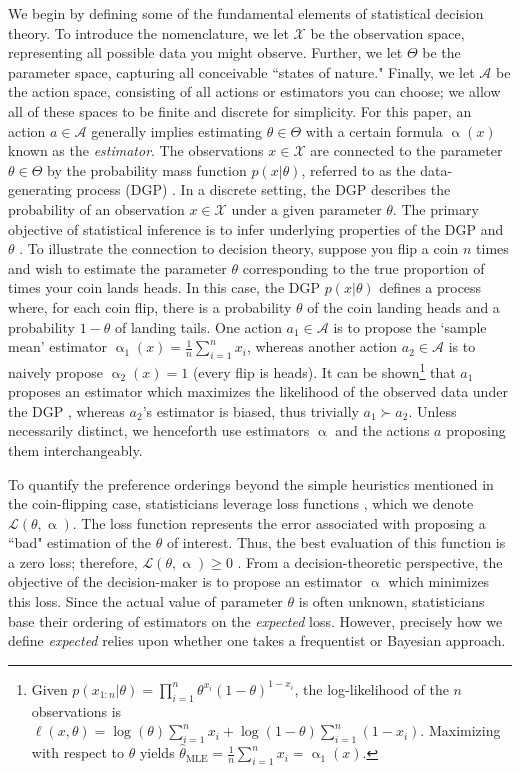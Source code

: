 \documentclass[letterpaper,12pt]{article}
\newcommand{\given}{|}
\begin{document}
We begin by defining some of the fundamental elements of statistical decision theory. To introduce the nomenclature, we let $\mathcal{X}$ be the observation space, representing all possible data you might observe. Further, we let ${\Theta}$ be the parameter space, capturing all conceivable ``states of nature." Finally, we let $\mathcal{A}$ be the action space, consisting of all actions or estimators you can choose; we allow all of these spaces to be finite and discrete for simplicity. For this paper, an action $a \in \mathcal{A}$ generally implies estimating $\theta \in \Theta$ with a certain formula $\upalpha(x)$ known as the \textit{estimator}. The observations $x \in \mathcal{X}$ are connected to the parameter $\theta \in \Theta$ by the probability mass function $p(x \given \theta)$, referred to as the data-generating process (DGP) \cite{tu2004data}. In a discrete setting, the DGP describes the probability of an observation $x \in \mathcal{X}$ under a given parameter $\theta$. The primary objective of statistical inference is to infer underlying properties of the DGP and $\theta$ \cite{upton2008oxford}. To illustrate the connection to decision theory\label{ex:1}, suppose you flip a coin $n$ times and wish to estimate the parameter $\theta$ corresponding to the true proportion of times your coin lands heads. In this case, the DGP $p(x \given \theta)$ defines a process where, for each coin flip, there is a probability $\theta$ of the coin landing heads and a probability $1- \theta$ of landing tails. One action $a_1 \in \mathcal{A}$ is to propose the `sample mean' estimator $\upalpha_1(x) = \frac{1}{n}\sum_{i = 1}^n x_i$, whereas another action $a_2 \in \mathcal{A}$ is to naively propose $\upalpha_2 (x) = 1$ (every flip is heads). It can be shown\footnote{ Given $p(x_{1:n}\given \theta) = \prod_{i = 1}^n\theta^{x_i}(1-\theta)^{1-x_i}$, the log-likelihood of the $n$ observations is $\ell(x, \theta) = \log(\theta) \sum_{i = 1}^n x_i + \log(1 - \theta) \sum_{i = 1}^n (1 - x_i)$. Maximizing with respect to $\theta$ yields $\hat{\theta}_{\text{MLE}} = \frac{1}{n}\sum_{i = 1}^n x_i = \upalpha_1(x)$.} that $a_1$ proposes an estimator which maximizes the likelihood of the observed data under the DGP \cite{rossi2018}, whereas $a_2$'s estimator is biased, thus trivially $a_1 \succ a_2$. Unless necessarily distinct, we henceforth use estimators $\upalpha$ and the actions $a$ proposing them interchangeably. 

To quantify the preference orderings beyond the simple heuristics mentioned in the coin-flipping case, statisticians leverage loss functions \cite{wald1950}, which we denote $\mathcal{L}(\theta, \upalpha)$. The loss function represents the error associated with proposing a ``bad" estimation of the $\theta$ of interest. Thus, the best evaluation of this function is a zero loss; therefore, $\mathcal{L}(\theta, \upalpha) \geq 0$ \cite{robert2007bayesian}. From a decision-theoretic perspective, the objective of the decision-maker is to propose an estimator $\upalpha$ which minimizes this loss. Since the actual value of parameter $\theta$ is often unknown, statisticians base their ordering of estimators on the \textit{expected} loss. However, precisely how we define \textit{expected} relies upon whether one takes a frequentist or Bayesian approach. 
\end{document}
